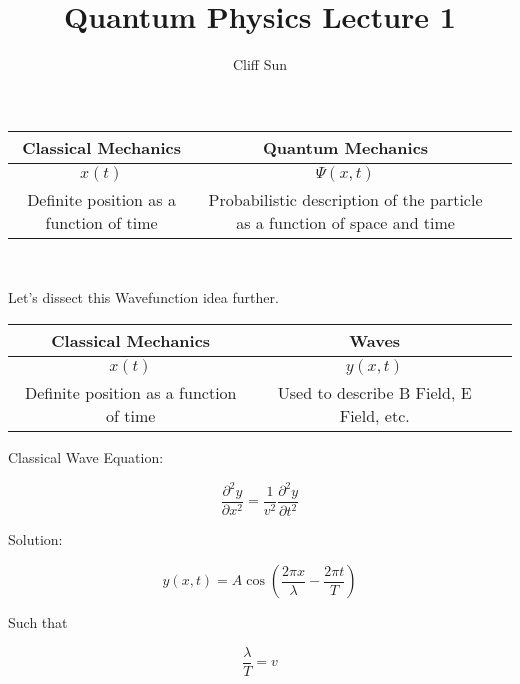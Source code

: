 \documentclass{article}
\title{Quantum Physics Lecture 1}
\author{Cliff Sun}
\newtheorem{one minute paper}[theorem]{One Minute Paper}
\begin{document}
\maketitle

\begin{center}
    \begin{tabular}{|c|c|c|}
        \hline
        Classical Mechanics & Quantum Mechanics \\ \hline
        $x(t)$ & $\Psi(x,t)$ \\ \hline
        Definite position as a function of time & Probabilistic description of the particle as a function of space and time \\ \hline
    \end{tabular} \\
\end{center}

\begin{center}
    Let's dissect this Wavefunction idea further. \\   
\end{center}

\begin{center}
    \begin{tabular}{|c|c|c|}
        \hline
        Classical Mechanics & Waves \\ \hline
        $x(t)$ & $y(x,t)$ \\ \hline
        Definite position as a function of time & Used to describe B Field, E Field, etc. \\ \hline
    \end{tabular}
\end{center}

Classical Wave Equation:

\begin{equation}
    \frac{\partial^2 y}{\partial x^2} = \frac{1}{v^2}\frac{\partial^2 y}{\partial t^2}
\end{equation}

Solution:

\begin{equation}
    y(x,t) = A\cos(\frac{2\pi x}{\lambda} - \frac{2\pi t}{T})
\end{equation}

Such that 

\begin{equation}
    \frac{\lambda}{T} = v
\end{equation}
\end{document}
